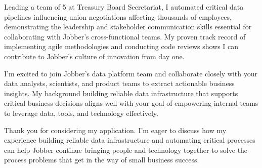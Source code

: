 \documentclass[11pt, letterpaper]{awesome-cv}
\begin{document}
\begin{cvletter}
Leading a team of 5 at Treasury Board Secretariat, I automated critical data pipelines influencing union negotiations affecting thousands of employees, demonstrating the leadership and stakeholder communication skills essential for collaborating with Jobber's cross-functional teams. My proven track record of implementing agile methodologies and conducting code reviews shows I can contribute to Jobber's culture of innovation from day one.

I'm excited to join Jobber's data platform team and collaborate closely with your data analysts, scientists, and product teams to extract actionable business insights. My background building reliable data infrastructure that supports critical business decisions aligns well with your goal of empowering internal teams to leverage data, tools, and technology effectively.

Thank you for considering my application. I'm eager to discuss how my experience building reliable data infrastructure and automating critical processes can help Jobber continue bringing people and technology together to solve the process problems that get in the way of small business success.
\end{cvletter}


\makeletterclosing%
\end{document}
